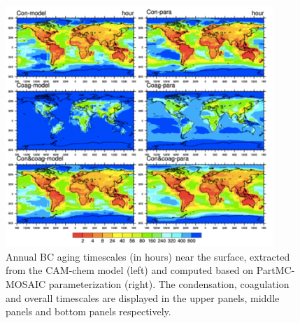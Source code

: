 \documentclass[12pt, fullpage]{uiucthesis2009_2}
\begin{document}
	
	\begin{figure}[h] 
		\begin{center}
			\includegraphics[width = 0.9\textwidth]{Figure32}
			\caption[Annual BC aging timescales (in hours) near the surface, extracted from the CAM-chem model (left) and computed based on PartMC-MOSAIC parameterization (right). The condensation, coagulation and overall timescales are displayed in the upper panels, middle panels and bottom panels respectively]{\label{fig_p32} Annual BC aging timescales (in hours) near the surface, extracted from the CAM-chem model (left) and computed based on PartMC-MOSAIC parameterization (right). The condensation, coagulation and overall timescales are displayed in the upper panels, middle panels and bottom panels respectively.}
		\end{center}
	\end{figure}
\end{document}

